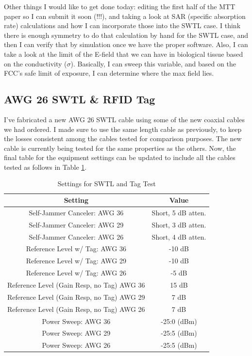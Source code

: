 \documentclass[12pt,onecolumn,titlepage]{article}
\begin{document}
Other things I would like to get done today: editing the first half of the MTT paper so I can submit it soon (!!!), and taking a look at SAR (specific absorption rate) calculations and how I can incorporate those into the SWTL case. I think there is enough symmetry to do that calculation by hand for the SWTL case, and then I can verify that by simulation once we have the proper software. Also, I can take a look at the limit of the E-field that we can have in biological tissue based on the conductivity ($\sigma$). Basically, I can sweep this variable, and based on the FCC's safe limit of exposure, I can determine where the max field lies. 

\subsection{AWG 26 SWTL \& RFID Tag}
\indent \indent I've fabricated a new AWG 26 SWTL cable using some of the new coaxial cables we had ordered. I made sure to use the same length cable as previously, to keep the losses consistent among the cables tested for comparison purposes. The new cable is currently being tested for the same properties as the others. Now, the final table for the equipment settings can be updated to include all the cables tested as follows in Table \ref{tab:SWTL_w_tag_test_settings_final}.


\begin{table}[h!]
\centering
	\caption{ Settings for SWTL and Tag Test }
	\begin{tabular}{| c | c |}
	\hline
	{\bf Setting} & {\bf Value} \\ \hline
	Self-Jammer Canceler: AWG 36 & Short, 5 dB atten.  \\ \hline
	Self-Jammer Canceler: AWG 29 & Short, 3 dB atten.  \\ \hline
	Self-Jammer Canceler: AWG 26 & Short, 4 dB atten.  \\ \hline
	Reference Level w/ Tag: AWG 36 & -10 dB  \\ \hline
	Reference Level w/ Tag: AWG 29 & -10 dB  \\ \hline
	Reference Level w/ Tag: AWG 26 & -5 dB  \\ \hline
	Reference Level (Gain Resp, no Tag) AWG 36 & 15 dB \\ \hline
	Reference Level (Gain Resp, no Tag) AWG 29 & 7 dB \\ \hline
	Reference Level (Gain Resp, no Tag) AWG 26 & 7 dB \\ \hline
	Power Sweep: AWG 36 & -25:0 (dBm)  \\ \hline
	Power Sweep: AWG 29 & -25:5 (dBm) \\ \hline
	Power Sweep: AWG 26 & -25:5 (dBm) \\ \hline
	\end{tabular}
\label{tab:SWTL_w_tag_test_settings_final}
\end{table}
\end{document}
